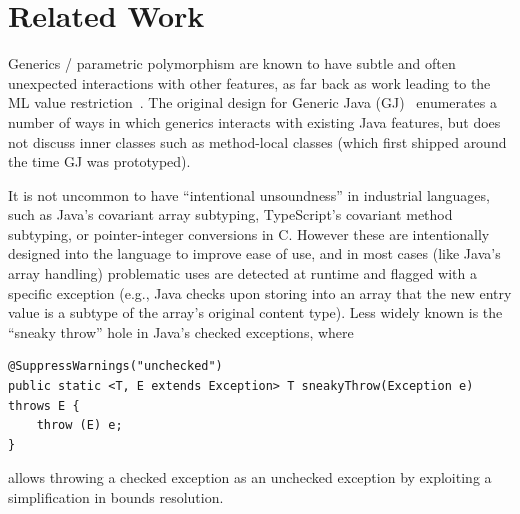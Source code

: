 \section{Related Work}
\label{sec:related}
Generics / parametric polymorphism are known to have subtle and often unexpected interactions with other features,
as far back as work leading to the ML value restriction~\cite{wright1995simple,garrigue2004relaxing}.
The original design for Generic Java (GJ)~\cite{bracha1998making} enumerates a number of ways in which generics interacts with existing Java features, but does not discuss inner classes such as method-local classes (which first shipped around the time GJ was prototyped).

It is not uncommon to have ``intentional unsoundness'' in industrial languages,
such as Java's covariant array subtyping, TypeScript's covariant method subtyping, or pointer-integer conversions in C.
However these are intentionally designed into the language to improve ease of use, and in most cases (like Java's array handling)
problematic uses are detected at runtime and flagged with a specific exception (e.g., Java checks upon storing into an array that the new entry value
is a subtype of the array's original content type).
Less widely known is the ``sneaky throw'' hole in Java's checked exceptions, where
\begin{lstlisting}
@SuppressWarnings("unchecked")
public static <T, E extends Exception> T sneakyThrow(Exception e) throws E {
    throw (E) e;
}
\end{lstlisting}
allows throwing a checked exception as an unchecked exception by exploiting a simplification in bounds resolution.

